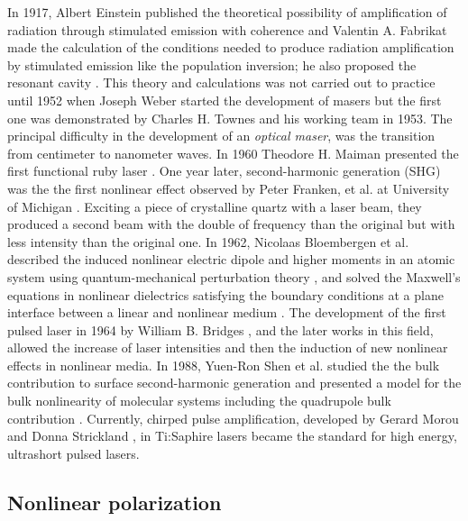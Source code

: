 In 1917, Albert Einstein published the theoretical possibility of amplification
of radiation through stimulated emission with coherence \cite{rawicz08PSPIE}
and Valentin A. Fabrikat made the calculation of the conditions needed to
produce radiation amplification by stimulated emission like the population
inversion; he also proposed the resonant cavity \cite{lukishova10JEOSRP}. This
theory and calculations was not carried out to practice until 1952 when Joseph
Weber started the development of masers but the first one was demonstrated by
Charles H. Townes and his working team in 1953. The principal difficulty in the
development of an \emph{optical maser}, was the transition from centimeter to
nanometer waves. In 1960 Theodore H. Maiman presented the first functional ruby
laser \cite{maiman60Nat}.
One year later, second-harmonic generation (SHG) was the the first nonlinear
effect observed by Peter Franken, et al. at University of Michigan
\cite{franken61PRL}. Exciting a piece of crystalline quartz with a laser beam,
they produced a second beam with the double of frequency than the original but
with less intensity than the original one.
% 
In 1962, Nicolaas Bloembergen et al. described the induced nonlinear electric
dipole and higher moments in an atomic system using quantum-mechanical
perturbation theory \cite{armstrong62PR}, and solved the  Maxwell's equations
in nonlinear dielectrics satisfying the boundary conditions at a plane
interface between a linear and nonlinear medium \cite{bloembergen1962PR}.
% 
The development of the first pulsed laser in 1964 by William B. Bridges
\cite{bridges1964APL}, and the later works in this field, allowed the increase
of laser intensities and then the induction of new nonlinear effects in
nonlinear media. 
% 
In 1988, Yuen-Ron Shen et al. studied the the bulk contribution to surface
second-harmonic generation and presented a model for the bulk nonlinearity of
molecular systems including the quadrupole bulk contribution \cite{guyot88PRB}.
% 
Currently, chirped pulse amplification, developed by Gerard Morou and Donna
Strickland \cite{strickland85OC}, in Ti:Saphire lasers became the standard for
high energy, ultrashort pulsed lasers.

\subsection{Nonlinear polarization}
\label{sec:nonlinear_polarization}

